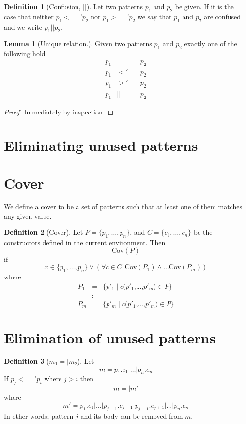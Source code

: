 \documentclass[a4paper, oneside, draft]{memoir}
\theoremstyle{definition}
\newtheorem{definition}{Definition}
\newtheorem{lemma}{Lemma}
\newcommand{\Cov}{\mathrm{Cov}}
\begin{document}
\begin{definition}[Confusion, $||$]\label{def:pat-confusion}
  Let two patterns $p_1$ and $p_2$ be given. If it is the case that neither $p_1
  <=' p_2$ nor $p_1 >=' p_2$ we say that $p_1$ and $p_2$ are confused and we
  write $p_1 || p_2$.
\end{definition}

\begin{lemma}[Unique relation.]
  Given two patterns $p_1$ and $p_2$ exactly one of the following hold
  \begin{eqnarray*}
    p_1 &==& p_2\\
    p_1 &<'& p_2\\
    p_1 &>'& p_2\\
    p_1 &||& p_2
  \end{eqnarray*}
\end{lemma}
\begin{proof}
  Immediately by inspection.
\end{proof}

\section{Eliminating unused patterns}

\section{Cover}
We define a cover to be a set of patterns such that at least one of them matches
any given value.

\begin{definition}[Cover]\label{def:cover}
  Let $P = \{p_1, \ldots, p_n \}$, and $C = \{c_1, \ldots, c_n\}$ be the constructors
  defined in the current environment. Then
  \[
  \Cov(P)
  \]
  if
  \[
  x \in \{p_1, \ldots, p_n \} \lor (\forall c \in C : \Cov(P_1) \land
  \ldots \Cov(P_m))
  \]
  where
  \begin{eqnarray*}
    P_1 &=& \{p'_1 \mid c \texttt{(} p'_1 \texttt{,} \ldots \texttt{,} p'_m \texttt{)} \in P\}\\
    &\vdots&\\
    P_m &=& \{p'_m \mid c \texttt{(} p'_1 \texttt{,} \ldots \texttt{,} p'_m \texttt{)} \in P\}
  \end{eqnarray*}
\end{definition}

\section{Elimination of unused patterns}\label{sec:elim-unus-patt}
\begin{definition}[$m_1 =| m_2$]
  Let
  \[
  m = p_1\texttt{.}e_1 \texttt{|} \ldots \texttt{|} p_n\texttt{.}e_n
  \]
  If $p_j <=' p_i$ where $j > i$ then 
  \[
  m =| m'
  \]
  where
  \[
  m' = p_1\texttt{.}e_1 \texttt{|} \ldots \texttt{|}
  p_{j-1}\texttt{.}e_{j-1} \texttt{|} p_{j+1}\texttt{.}e_{j+1} \texttt{|}
  \ldots \texttt{|} p_n\texttt{.}e_n
  \]
  In other words; pattern $j$ and its body can be removed from $m$.
\end{definition}
\end{document}
